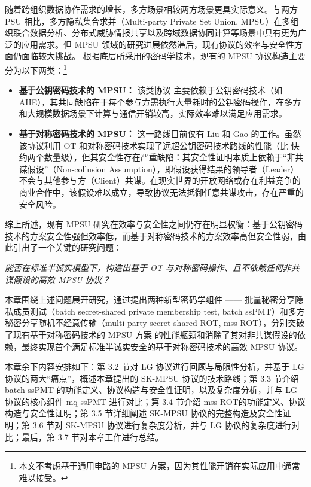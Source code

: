 随着跨组织数据协作需求的增长，多方场景相较两方场景更具实际意义。与两方 PSU 相比，多方隐私集合求并（Multi-party Private Set Union, MPSU）在多组织联合数据分析、分布式威胁情报共享以及跨域数据协同计算等场景中具有更为广泛的应用需求。但 MPSU 领域的研究进展依然滞后，现有协议的效率与安全性方面仍面临较大挑战。
根据底层所采用的密码学技术，现有的 MPSU 协议构造主要分为以下两类：\footnote{本文不考虑基于通用电路的 MPSU 方案，因为其性能开销在实际应用中通常难以接受。}
\begin{itemize}
    \item \textbf{基于公钥密码技术的 MPSU：} 该类协议 \cite{KS-CRYPTO-2005, Frikken-ACNS-2007, VCE22, GNT-eprint-2023} 主要依赖于公钥密码技术（如 AHE），其共同缺陷在于每个参与方需执行大量耗时的公钥密码操作，在多方和大规模数据场景下计算与通信开销较高，实际效率难以满足应用需求。
    \item \textbf{基于对称密码技术的 MPSU：} 这一路线目前仅有 Liu 和 Gao \cite{LG-ASIACRYPT-2023} 的工作。虽然该协议利用 OT 和对称密码技术实现了远超公钥密码技术路线的性能（比 \cite{VCE22} 快约两个数量级），但其安全性存在严重缺陷：其安全性证明本质上依赖于“非共谋假设”（Non-collusion Assumption），即假设获得结果的领导者（Leader）不会与其他参与方（Client）共谋。在现实世界的开放网络或存在利益竞争的商业合作中，该假设难以成立，导致协议无法抵御任意共谋攻击，存在严重的安全风险。

\end{itemize}

综上所述，现有 MPSU 研究在效率与安全性之间仍存在明显权衡：基于公钥密码技术的方案安全性强但效率低，而基于对称密码技术的方案效率高但安全性弱，由此引出了一个关键的研究问题：
\begin{center}
\emph{能否在标准半诚实模型下，构造出基于 OT 与对称密码操作、且不依赖任何非共谋假设的高效 MPSU 协议？}
\end{center}

本章围绕上述问题展开研究，通过提出两种新型密码学组件 —— 批量秘密分享隐私成员测试（batch secret-shared private membership test, batch ssPMT）和多方秘密分享随机不经意传输（multi-party secret-shared ROT, mss-ROT），分别突破了现有基于对称密码技术的 MPSU 方案 \cite{LG-ASIACRYPT-2023} 的性能瓶颈和消除了其对非共谋假设的依赖，最终实现首个满足标准半诚实安全的基于对称密码技术的高效 MPSU 协议。

本章余下内容安排如下：第 3.2 节对 LG 协议进行回顾与局限性分析，并基于 LG 协议的两大“痛点”，概述本章提出的 SK-MPSU 协议的技术路线；第 3.3 节介绍 batch ssPMT 的功能定义、协议构造与安全性证明，以及复杂度分析，并与 LG 协议的核心组件 mq-ssPMT 进行对比；第 3.4 节介绍 mss-ROT的功能定义、协议构造与安全性证明；第 3.5 节详细阐述 SK-MPSU 协议的完整构造及安全性证明；第 3.6 节对 SK-MPSU 协议进行复杂度分析，并与 LG 协议的复杂度进行对比；最后，第 3.7 节对本章工作进行总结。

